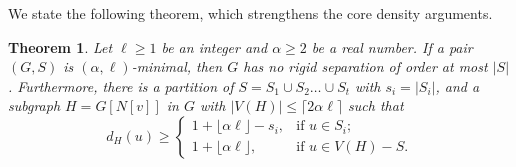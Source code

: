 \documentclass[11pt]{amsart}
\newtheorem{theorem}{Theorem}
\begin{document}
We state the following theorem, which strengthens the core density arguments.

\begin{theorem}\label{mass-min}
Let $\ell\ge 1$ be an integer and $\alpha\ge 2$ be a real number. If a pair $(G,S)$ is $(\alpha, \ell)$-minimal, then $G$ has no rigid separation of order at most $|S|$. Furthermore, there is a partition of $S=S_1\cup S_2\ldots\cup S_t$ with $s_i=|S_i|$, and a subgraph $H=G[N[v]]$ in $G$ with $|V(H)|\le \lceil 2\alpha \ell\rceil$ such that  
$$d_H(u) \ge 
\begin{cases}
1+\lfloor\alpha \ell\rfloor-s_i, & \mbox{if $u \in S_i$;}\\
1+\lfloor\alpha \ell\rfloor, & \mbox{
if $u \in V(H)-S$}.
\end{cases}
$$
\end{theorem}
\end{document}
